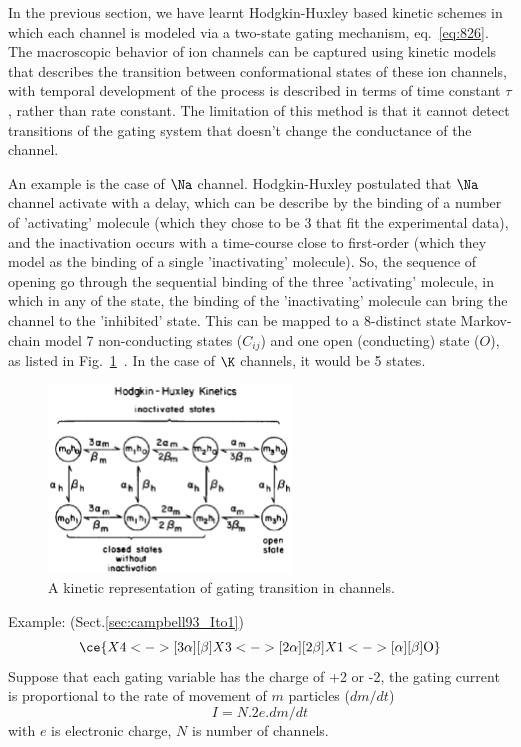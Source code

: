 In the previous section, we have learnt Hodgkin-Huxley based kinetic schemes in
which each channel is modeled via a two-state gating mechanism,
eq.~\eqref{eq:826}. The macroscopic behavior of ion channels can be captured
using kinetic models that describes the transition between conformational states
of these ion channels, with temporal development of the process is described in
terms of time constant $\tau$, rather than rate constant. The limitation of this
method is that it cannot detect transitions of the gating system that doesn't
change the conductance of the channel.

An example is the case of $\Na$ channel. Hodgkin-Huxley postulated that $\Na$
channel activate with a delay, which can be describe by the binding of a number
of 'activating' molecule (which they chose to be 3 that fit the experimental
data), and the inactivation occurs with a time-course close to first-order
(which they model as the binding of a single 'inactivating' molecule). So, the
sequence of opening go through the sequential binding of the three 'activating'
molecule, in which in any of the state, the binding of the 'inactivating'
molecule can bring the channel to the 'inhibited' state. This can be mapped to a
8-distinct state Markov-chain model 7 non-conducting states ($C_{ij}$) and one
open (conducting) state ($O$), as listed in
Fig.~\ref{fig:Na-channel-states}~\citep{hille1978ice}. In the case of $\K$
channels, it would be 5 states.




\begin{figure}[hbt]
  \centerline{\includegraphics[height=5cm]{./images/Na-HH-model.eps}}
  \caption{A kinetic representation of gating transition in  channels.}
  \label{fig:Na-channel-states}
\end{figure}


Example: \citep{Campbell1993} (Sect.\ref{sec:campbell93_Ito1})
\begin{equation}
\ce{ X4 <->[3\alpha][\beta] X3 <->[2\alpha][2\beta] X1 <->[\alpha][\beta]
\text{O}}
\end{equation}
Suppose that each gating variable has the charge of +2 or -2, the gating current
is proportional to the rate of movement of $m$ particles ($dm/dt$)
\begin{equation}
I = N.2e.dm/dt
\end{equation}
with $e$ is electronic charge, $N$ is number of channels.


